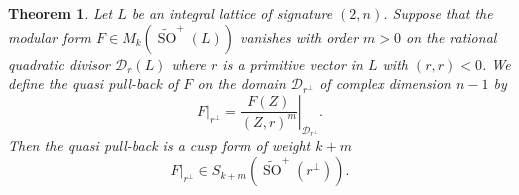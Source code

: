 \documentclass[a4paper,11pt]{article}
\newtheorem{theorem}[lemma]{Theorem}
\renewcommand{\cD}{\mathcal D}
\renewcommand{\Tilde}{\widetilde}
\newcommand{\SO}{\mathop{\mathrm {SO}}\nolimits}
\begin{document}
\begin{theorem}\label{thm:qpbcusp}
Let $L$ be an integral lattice of signature $(2,n)$.  Suppose that the
modular form $F\in M_k(\Tilde{\SO}^+(L))$ vanishes with order $m>0$ on
the rational quadratic divisor $\cD_r(L)$ where $r$ is a primitive
vector in $L$ with $(r,r)<0$.  We define the quasi pull-back of $F$ on
the domain $\cD_{r^\perp}$ of complex dimension $n-1$ by
\begin{equation}\label{quasi-r}
F|_{r^\perp}=\left.{\frac{F(Z)}{(Z,r)^m}} \right\vert_{\cD_{r^\perp}}.
\end{equation}
Then the quasi pull-back is a cusp form of weight $k+m$
\begin{equation*}
F|_{r^\perp}\in S_{k+m}(\Tilde{\SO}^+(r^\perp)).
\end{equation*}
\end{theorem}
\end{document}
